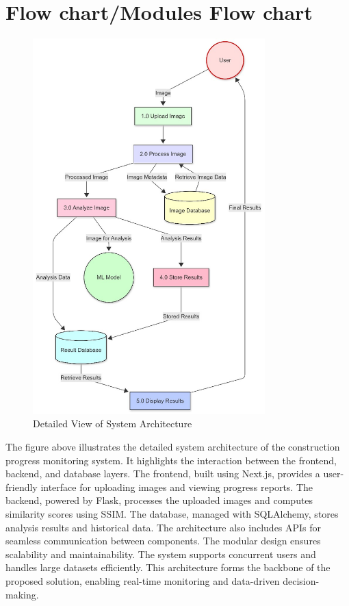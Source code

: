 \documentclass[12pt,a4paper]{report}
\begin{document}
\section{Flow chart/Modules Flow chart }
\begin{figure}[H]
    \centering
    \includegraphics[width=0.8\textwidth]{images/Image 2025-04-27 at 13.08.47_8d5485ec.jpg}
    \caption{Detailed View of System Architecture}
    \label{fig:detailed-system-architecture}
\end{figure}

The figure above illustrates the detailed system architecture of the construction progress monitoring system. It highlights the interaction between the frontend, backend, and database layers. The frontend, built using Next.js, provides a user-friendly interface for uploading images and viewing progress reports. The backend, powered by Flask, processes the uploaded images and computes similarity scores using SSIM. The database, managed with SQLAlchemy, stores analysis results and historical data. The architecture also includes APIs for seamless communication between components. The modular design ensures scalability and maintainability. The system supports concurrent users and handles large datasets efficiently. This architecture forms the backbone of the proposed solution, enabling real-time monitoring and data-driven decision-making.
\end{document}

